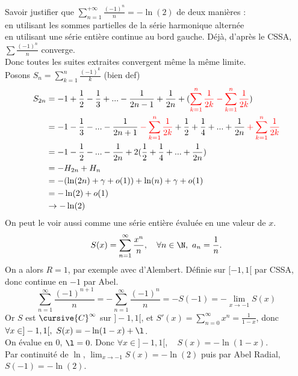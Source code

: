 \documentclass[french, 11pt]{article}
\begin{document}
\begin{exercice}{}{}
    Savoir justifier que $\sum_{n=1}^{+\infty} \frac{(-1)^n}{n} = -\ln(2)$ de deux manières :\\
     en utilisant les sommes partielles de la série harmonique alternée\\
     en utilisant une série entière continue au bord gauche.
    \tcblower
    Déjà, d'après le CSSA, $\sum \frac{(-1)^n}{n}$ converge.\\
    Donc toutes les suites extraites convergent même la même limite.\\
     Posons $S_n = \sum_{k = 1}^{n} \frac{(-1)^k}{k}$ (bien def)
    \[
    \begin{aligned}
        S_{2n} &= -1 + \frac 1 2 - \frac 1 3 + ... - \frac{1}{2n-1} + \frac 1 {2n} + (\mathcolor{red}{\sum_{k = 1}^{n} \frac{1}{2k} - \sum_{k = 1}^n \frac{1}{2k}})\\
        &= -1 -\frac 1 3 - ... - \frac 1 {2n+1} \mathcolor{red}{- \sum_{k = 1}^n \frac{1}{2k}} + \frac 1 2 + \frac 1 4 + ... + \frac 1 {2n} \mathcolor{red}{+ \sum_{k = 1}^{n}\frac{1}{2k}}\\
        &= -1 - \frac 1 2 -...-\frac{1}{2n} + 2(\frac 1 2 + \frac 1 4 + ... + \frac 1 {2n})\\
        &= -H_{2n} + H_n\\
        &= -(\ln(2n) + \gamma + o(1)) + \ln(n) + \gamma + o(1)\\
        &= -\ln(2) + o(1)\\
        &\to -\ln(2)
    \end{aligned}
    \]
     On peut le voir aussi comme une série entière évaluée en une valeur de $x$.
    \begin{equation*}
        S(x) = \sum_{n=1}^{\infty}\frac{x^n}{n}, \quad \forall n \in \N, ~ a_n = \frac{1}{n}.
    \end{equation*}
    On a alors $R=1$, par exemple avec d'Alembert. Définie sur $[-1,1[$ par CSSA, donc continue en $-1$ par Abel.
    \begin{equation*}
        \sum_{n=1}^\infty\frac{(-1)^{n+1}}{n} = -\sum_{n=1}^\infty\frac{(-1)^n}{n} = -S(-1) = - \lim_{x\to-1}S(x)
    \end{equation*}
    Or $S$ est $\cursive{C}^\infty$ sur $]-1,1[$, et $S'(x)=\sum_{n=0}^\infty x^n = \frac{1}{1-x}$, donc $\forall x \in ]-1,1[, ~  S(x)=-\ln(1-x)+\l$.\\
    On évalue en $0$, $\l=0$. Donc $\forall x \in ]-1,1[$, ~ $S(x)=-\ln(1-x)$.\\
    Par continuité de $\ln$, $\lim_{x\to-1}S(x)=-\ln(2)$ puis par Abel Radial, $S(-1)=-\ln(2)$.
\end{exercice}
\end{document}
